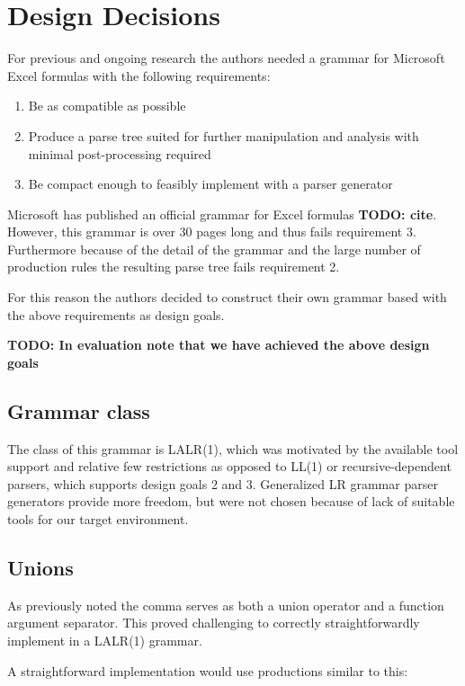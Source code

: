 \documentclass[conference]{IEEEtran}
\newcommand{\todo}[1]{\textbf{TODO: #1}}
\begin{document}
\section{Design Decisions}
For previous and ongoing research the authors needed a grammar for Microsoft Excel formulas with the following requirements:

\begin{enumerate}
\item Be as compatible as possible
\item Produce a parse tree suited for further manipulation and analysis with minimal post-processing required
\item Be compact enough to feasibly implement with a parser generator
\end{enumerate}

Microsoft has published an official grammar for Excel formulas \todo{cite}.
However, this grammar is over 30 pages long and thus fails requirement 3.
Furthermore because of the detail of the grammar and the large number of production rules the resulting parse tree fails requirement 2.

For this reason the authors decided to construct their own grammar based with the above requirements as design goals.

\todo{In evaluation note that we have achieved the above design goals}

\subsection{Grammar class}

The class of this grammar is LALR(1), which was motivated by the available tool support and relative few restrictions as opposed to LL(1) or recursive-dependent parsers, which supports design goals 2 and 3.
Generalized LR grammar parser generators provide more freedom, but were not chosen because of lack of suitable tools for our target environment.

\subsection{Unions}
\label{subsec:desing:unions}

As previously noted the comma serves as both a union operator and a function argument separator.
This proved challenging to correctly straightforwardly implement in a LALR(1) grammar.

A straightforward implementation would use productions similar to this:
\end{document}
